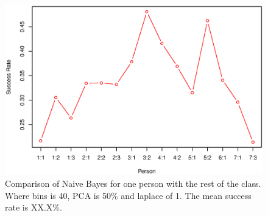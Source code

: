 \begin{figure}[H]
\centering
\includegraphics[width = \textwidth]{graphics/graph_baye_comparison}
\caption{Comparison of Naive Bayes for one person with the rest of the class.
Where bins is 40, PCA is 50\% and laplace of 1. The mean success rate is XX.X\%.}
\label{fig:comp_naiveBayes}
\end{figure}






